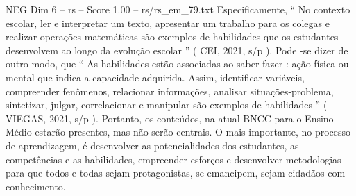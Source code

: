 \begin{textsample}{NEG Dim 6 – rs – Score 1.00 – rs/rs\_em\_79.txt}
Especificamente, “ No contexto escolar, ler e interpretar um texto, apresentar um trabalho para os colegas e realizar operações matemáticas são exemplos de habilidades que os estudantes desenvolvem ao longo da evolução escolar ” ( CEI, 2021, s/p ).
Pode -se dizer de outro modo, que “ As habilidades estão associadas ao saber fazer : ação física ou mental que indica a capacidade adquirida.
Assim, identificar variáveis, compreender fenômenos, relacionar informações, analisar situações-problema, sintetizar, julgar, correlacionar e manipular são exemplos de habilidades ” ( VIEGAS, 2021, s/p ).
Portanto, os conteúdos, na atual BNCC para o Ensino Médio estarão presentes, mas não serão centrais.
O mais importante, no processo de aprendizagem, é desenvolver as potencialidades dos estudantes, as competências e as habilidades, empreender esforços e desenvolver metodologias para que todos e todas sejam protagonistas, se emancipem, sejam cidadãos com conhecimento.

\end{textsample}
